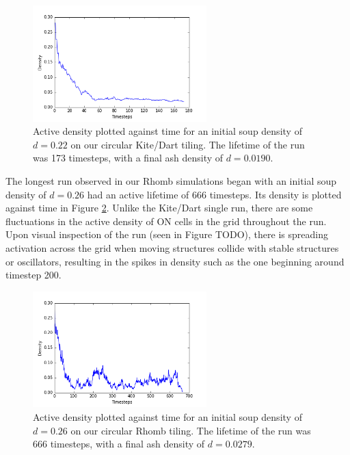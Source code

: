 \documentclass[a4paper,11pt]{report}
\begin{document}
\begin{figure}[htp]
\centering
\includegraphics[width=0.6\textwidth]{ch4_figs/ckd_173_density_lifetime}
\caption[Kite/Dart Single Run Density Graph]{
	Active density plotted against time for an initial soup density of $d=0.22$ on our circular Kite/Dart tiling. The lifetime of the run was 173 timesteps, with a final ash density of $d=0.0190$.
}
\label{fig:ckd_single}
\end{figure}

The longest run observed in our Rhomb simulations began with an initial soup density of $d=0.26$ had an active lifetime of 666 timesteps. Its density is plotted against time in Figure \ref{fig:crh_single}. Unlike the Kite/Dart single run, there are some fluctuations in the active density of ON cells in the grid throughout the run. Upon visual inspection of the run (seen in Figure TODO), there is spreading activation across the grid when moving structures collide with stable structures or oscillators, resulting in the spikes in density such as the one beginning around timestep 200.

\begin{figure}[htp]
\centering
\includegraphics[width=0.6\textwidth]{ch4_figs/crh_666_density_lifetime}
\caption[Rhomb Single Run Density Graph]{
	Active density plotted against time for an initial soup density of $d=0.26$ on our circular Rhomb tiling. The lifetime of the run was 666 timesteps, with a final ash density of $d=0.0279$.
}
\label{fig:crh_single}
\end{figure}
\end{document}
